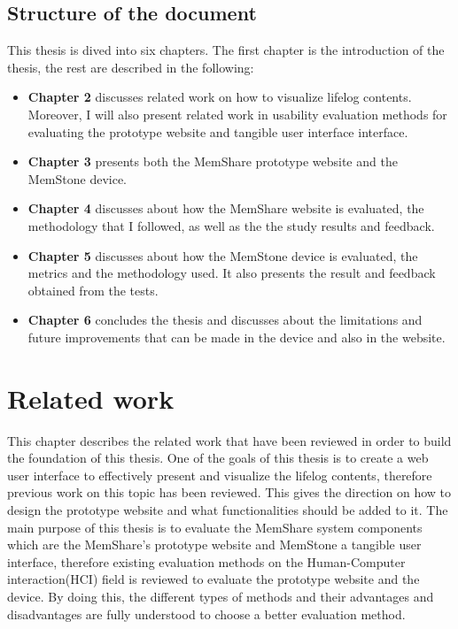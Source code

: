 \documentclass[mscthesis]{usiinfthesis}
\begin{document}
\section{Structure of the document}
This thesis is dived into six chapters. The first chapter is the introduction of the thesis, the rest are described in the following:
\begin{itemize}
\item \textbf{Chapter 2} discusses related work on how to visualize lifelog contents. Moreover, I will also present related work in usability evaluation methods for evaluating the prototype website and tangible user interface interface.
\item \textbf{Chapter 3} presents both the MemShare prototype website and the MemStone device.
\item \textbf{Chapter 4} discusses about how the MemShare website is evaluated, the methodology that I followed, as well as the the study results and feedback.
\item \textbf{Chapter 5} discusses about how the MemStone device is evaluated, the metrics and the methodology used. It also presents the result and feedback obtained from the tests.
\item \textbf{Chapter 6} concludes the thesis and discusses about the limitations and future improvements that can be made in the device and also in the website. 
\end{itemize}

\chapter{Related work}
This chapter describes the related work that have been reviewed in order to build the foundation of this thesis. One of the goals of this thesis is to create a web user interface to effectively present and visualize the lifelog contents, therefore previous work on this topic has been reviewed. This gives the direction on how to design the prototype website and what functionalities should be added to it. The main purpose of this thesis is to evaluate the MemShare system components which are the MemShare's prototype website and MemStone a tangible user interface, therefore existing evaluation methods on the Human-Computer interaction(HCI) field is reviewed to evaluate the prototype website and the device. By doing this, the different types of methods and their advantages and disadvantages are fully understood to choose a better evaluation method.     
\end{document}
